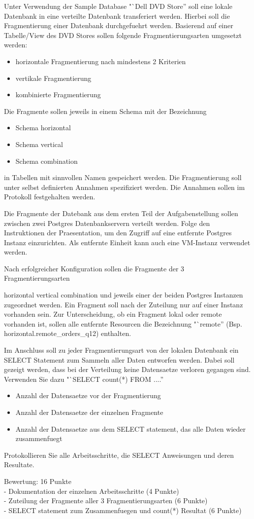 Unter Verwendung der Sample Database "`Dell DVD Store'' soll eine lokale Datenbank in eine verteilte Datenbank transferiert werden. Hierbei soll die Fragmentierung einer Datenbank durchgefuehrt werden. Basierend auf einer Tabelle/View des DVD Stores sollen folgende Fragmentierungsarten umgesetzt werden:
\begin{itemize}
	\item horizontale Fragmentierung nach mindestens 2 Kriterien
	\item vertikale Fragmentierung
	\item kombinierte Fragmentierung
\end{itemize}
Die Fragmente sollen jeweils in einem Schema mit der Bezeichnung
\begin{itemize}
	\item Schema horizontal
	\item Schema vertical
	\item Schema combination
\end{itemize}
in Tabellen mit sinnvollen Namen gespeichert werden. Die Fragmentierung soll unter selbst definierten Annahmen spezifiziert werden. Die Annahmen sollen im Protokoll festgehalten werden.

Die Fragmente der Datebank aus dem ersten Teil der Aufgabenstellung sollen zwischen zwei Postgres Datenbankservern verteilt werden.
Folge den Instruktionen der Praesentation, um den Zugriff auf eine entfernte Postgres Instanz einzurichten. Als entfernte Einheit kann auch eine VM-Instanz verwendet werden.

Nach erfolgreicher Konfiguration sollen die Fragmente der 3 Fragmentierungsarten

horizontal
vertical
combination
und jeweils einer der beiden Postgres Instanzen zugeordnet werden. Ein Fragment soll nach der Zuteilung nur auf einer Instanz vorhanden sein. Zur Unterscheidung, ob ein Fragment lokal oder remote vorhanden ist, sollen alle entfernte Resourcen die Bezeichnung "`remote'' (Bsp. horizontal.remote\_orders\_q12) enthalten.

Im Anschluss soll zu jeder Fragmentierungsart von der lokalen Datenbank ein SELECT Statement zum Sammeln aller Daten entworfen werden. Dabei soll gezeigt werden, dass bei der Verteilung keine Datensaetze verloren gegangen sind. Verwenden Sie dazu "`SELECT count(*) FROM ....''
\begin{itemize}
	\item Anzahl der Datensaetze vor der Fragmentierung
	\item Anzahl der Datensaetze der einzelnen Fragmente
	\item Anzahl der Datensaetze aus dem SELECT statement, das alle Daten wieder zusammenfuegt
\end{itemize}
Protokollieren Sie alle Arbeitsschritte, die SELECT Anweisungen und deren Resultate.

Bewertung: 16 Punkte\\
- Dokumentation der einzelnen Arbeitsschritte (4 Punkte)\\
- Zuteilung der Fragmente aller 3 Fragmentierungsarten (6 Punkte)\\
- SELECT statement zum Zusammenfuegen und count(*) Resultat (6 Punkte)\\
\clearpage